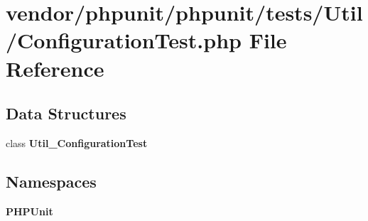 \section{vendor/phpunit/phpunit/tests/\+Util/\+Configuration\+Test.php File Reference}
\label{phpunit_2phpunit_2tests_2_util_2_configuration_test_8php}
\subsection*{Data Structures}
\begin{DoxyCompactItemize}
\item 
class {\bf Util\+\_\+\+Configuration\+Test}
\end{DoxyCompactItemize}
\subsection*{Namespaces}
\begin{DoxyCompactItemize}
\item 
 {\bf P\+H\+P\+Unit}
\end{DoxyCompactItemize}
